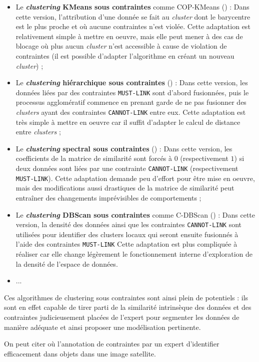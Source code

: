 		\begin{itemize}
			\item Le \textbf{\textit{clustering} KMeans sous contraintes} comme COP-KMeans (\cite{wagstaff-etal:2001:constrained-kmeans-clustering}) :
			Dans cette version, l'attribution d'une donnée se fait au \textit{cluster} dont le barycentre est le plus proche et où aucune contraintes n'est violée.
			Cette adaptation est relativement simple à mettre en oeuvre, mais elle peut mener à des cas de blocage où plus aucun \textit{cluster} n'est accessible à cause de violation de contraintes (il est possible d’adapter l'algorithme en créant un nouveau \textit{cluster}) ;
			\item Le \textbf{\textit{clustering} hiérarchique sous contraintes} (\cite{davidson-ravi:2005:agglomerative-hierarchical-clustering}) :
			Dans cette version, les données liées par des contraintes \texttt{MUST-LINK} sont d'abord fusionnées, puis le processus agglomératif commence en prenant garde de ne pas fusionner des \textit{clusters} ayant des contraintes \texttt{CANNOT-LINK} entre eux.
			Cette adaptation est très simple à mettre en oeuvre car il suffit d'adapter le calcul de distance entre \textit{clusters} ;
			\item Le \textbf{\textit{clustering} spectral sous contraintes} (\cite{kamvar-etal:2003:spectral-learning}) :
			Dans cette version, les coefficients de la matrice de similarité sont forcés à $0$ (respectivement $1$) si deux données sont liées par une contrainte \texttt{CANNOT-LINK} (respectivement \texttt{MUST-LINK}).
			Cette adaptation demande peu d'effort pour être mise en oeuvre, mais des modifications aussi drastiques de la matrice de similarité peut entraîner des changements imprévisibles de comportements ;
			\item Le \textbf{\textit{clustering} DBScan sous contraintes} comme C-DBScan (\cite{ruiz-etal:2010:densitybased-semisupervised-clustering}) :
			Dans cette version, la densité des données ainsi que les contraintes \texttt{CANNOT-LINK} sont utilisées pour identifier des clusters locaux qui seront ensuite fusionnés à l'aide des contraintes \texttt{MUST-LINK}
			Cette adaptation est plus compliquée à réaliser car elle change légèrement le fonctionnement interne d'exploration de la densité de l'espace de données.
			\item ...
		\end{itemize}
		
		Ces algorithmes de clustering sous contraintes sont ainsi plein de potentiels : ils sont en effet capable de tirer parti de la similarité intrinsèque des données et des contraintes judicieusement placées de l'expert pour segmenter les données de manière adéquate et ainsi proposer une modélisation pertinente.
		\begin{leftBarExamples}
			On peut citer \cite{lampert-etal:2019:constrained-distance-based} où l'annotation de contraintes par un expert d'identifier efficacement dans objets dans une image satellite.
		\end{leftBarExamples}
		

